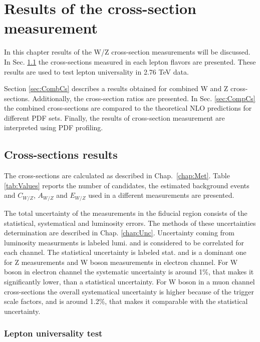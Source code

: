 \chapter{Results of the cross-section measurement}
\minitoc

In this chapter results of the W/Z cross-section measurements will be discussed. 
In Sec. \ref{sec:flavCs} the cross-sections measured in each lepton flavors are presented. These results are used to test lepton universality in 2.76 TeV data.

Section \ref{sec:CombCs} describes a results obtained for combined W and Z cross-sections. Additionally, the cross-section ratios are presented. In Sec. \ref{sec:CompCs} the combined cross-sections are compared to the theoretical NLO predictions for different PDF sets. Finally, the results of cross-section measurement are interpreted using PDF profiling.

\section{Cross-sections results}\label{sec:flavCs}

The cross-sections are calculated as described in Chap.~\ref{chap:Met}. Table \ref{tab:Values} reports the number of candidates, the estimated background events and $C_{W/Z}$, $A_{W/Z}$ and $E_{W/Z}$ used in a different measurements are presented. 

The total uncertainty of the measurements in the fiducial region consists of the statistical, systematical and luminosity errors. The methods of these uncertainties determination are described in Chap. \ref{chap:Unc}. Uncertainty coming from luminosity measurments is labeled lumi. and is considered to be correlated for each channel. The statistical uncertainty is labeled stat. and is a dominant one for Z measurements and W boson measurements in electron channel. For W boson in electron channel the systematic uncertainty is around 1\%, that makes it significantly lower, than a statistical uncertainty. For W boson in a muon channel cross-sections the overall systematical uncertainty is higher because of the trigger scale factors, and is around 1.2\%, that makes it comparable with the statistical uncertainty. 

%


\subsection{Lepton universality test}

